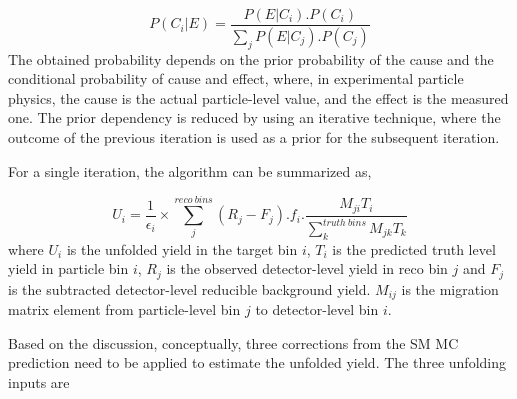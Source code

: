 \begin{equation}
P(C_{i}|E) = \frac{ P(E|C_{i}) . P(C_{i}) } { \sum_{j}{ P(E|C_{j}).P(C_{j}) } }
\label{eqn:BayesTheorem}
\end{equation}
The obtained probability depends on the prior probability of the cause and the conditional probability of cause and effect, where, in experimental particle physics, the cause is the actual particle-level value, and the effect is the measured one. The prior dependency is reduced by using an iterative technique, where the outcome of the previous iteration is used as a prior for the subsequent iteration.

For a single iteration, the algorithm can be summarized as, 

\begin{equation}
    U_{i} = \frac{1}{ \epsilon_{i} } \times \sum^{reco~bins}_{j}{ (R_j -F_j ) . f_{i} . \frac{M_{ji} T_{i}}{ \sum_{k}^{truth~bins}{M_{jk} T_{k}}} } 
    \label{eqn:BayesianUnfolding}
\end{equation}
where $U_{i}$ is the unfolded yield in the target bin $i$, $T_{i}$ is the predicted truth level yield in particle bin $i$, $R_{j}$ is the observed detector-level yield in reco bin $j$ and $F_{j}$ is the subtracted detector-level reducible background yield. $M_{ij}$ is the migration matrix element from particle-level bin $j$ to detector-level bin $i$. 

Based on the discussion, conceptually, three corrections from the SM MC prediction need to be applied to estimate the unfolded yield. The three unfolding inputs are 

